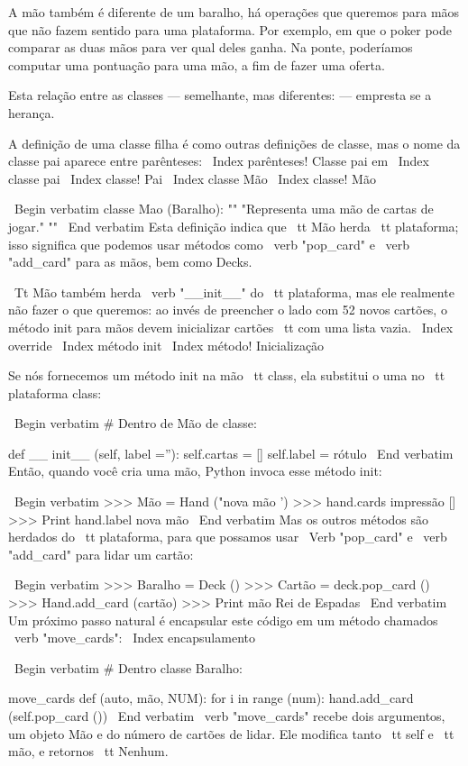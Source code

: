 \documentclass[10pt]{book}
\begin{document}
{{{{{{{{{{{{{{{{A mão também é diferente de um baralho, há operações que queremos para
mãos que não fazem sentido para uma plataforma. Por exemplo, em que o poker
pode comparar as duas mãos para ver qual deles ganha. Na ponte, poderíamos
computar uma pontuação para uma mão, a fim de fazer uma oferta.

Esta relação entre as classes --- semelhante, mas diferentes: --- empresta
se a herança.  

A definição de uma classe filha é como outras definições de classe,
mas o nome da classe pai aparece entre parênteses:
\ Index {parênteses! Classe pai em}
\ Index {classe pai}
\ Index {classe! Pai}
\ Index {classe Mão}
\ Index {classe! Mão}

\ Begin {verbatim}
classe Mao (Baralho):
    "" "Representa uma mão de cartas de jogar." ""
\ End {verbatim}
%
Esta definição indica que {\ tt Mão} herda {\ tt plataforma};
isso significa que podemos usar métodos como \ verb "pop_card" e \ verb "add_card"
para as mãos, bem como Decks.

{\ Tt Mão} também herda \ verb "__init__" do {\ tt plataforma}, mas
ele realmente não fazer o que queremos: ao invés de preencher o lado
com 52 novos cartões, o método init para mãos devem inicializar
{cartões \ tt} com uma lista vazia.
\ Index {override}
\ Index {método init}
\ Index {método! Inicialização}

Se nós fornecemos um método init na mão {\ tt} class, ela substitui o
uma no {\ tt plataforma} class:

\ Begin {verbatim}
# Dentro de Mão de classe:

    def __ init__ (self, label =''):
        self.cartas = []
        self.label = rótulo
\ End {verbatim}
%
Então, quando você cria uma mão, Python invoca esse método init:

\ Begin {verbatim}
>>> Mão = Hand ("nova mão ')
>>> hand.cards impressão
[]
>>> Print hand.label
nova mão
\ End {verbatim}
%
Mas os outros métodos são herdados do {\ tt plataforma}, para que possamos usar
\ Verb "pop_card" e \ verb "add_card" para lidar um cartão:

\ Begin {verbatim}
>>> Baralho = Deck ()
>>> Cartão = deck.pop_card ()
>>> Hand.add_card (cartão)
>>> Print mão
Rei de Espadas
\ End {verbatim}
%
Um próximo passo natural é encapsular este código em um método
chamados \ verb "move_cards":
\ Index {} encapsulamento

\ Begin {verbatim}
# Dentro classe Baralho:

    move_cards def (auto, mão, NUM):
        for i in range (num):
            hand.add_card (self.pop_card ())
\ End {verbatim}
%
\ verb "move_cards" recebe dois argumentos, um objeto Mão e do número de
cartões de lidar. Ele modifica tanto {\ tt self} e {\ tt mão}, e
retornos {\ tt Nenhum}.

}}}}}}}}}}}}}}}}
\end{document}
